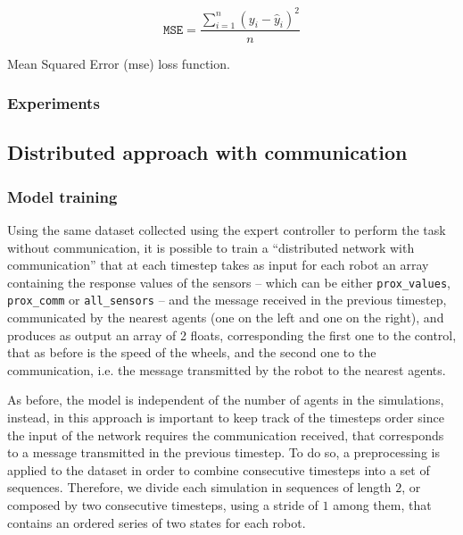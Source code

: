 \begin{Equation}[H]
	\centering
	\begin{equation}
	\mathtt{MSE} = \frac{\sum_{i=1}^n (y_i-\hat y_i)^2}{n}
	\end{equation}
	\caption{Mean Squared Error (\gls{mse}) loss function.}
	\label{eq:mse}
\end{Equation}
	

\subsubsection{Experiments}
\label{subsubsec:expdist}

\subsection{Distributed approach with communication}
\label{subsec:ex1comm}


\subsubsection{Model training}
\label{subsubsec:learnedcomm}

Using the same dataset collected using the expert controller to perform the task 
without communication, it is possible to train a ``distributed network with 
communication'' that at each timestep takes as input for each robot an array 
containing the response values of the sensors – which can be either 
\texttt{prox\_values}, \texttt{prox\_comm} or \texttt{all\_sensors} – and the 
message received in the previous timestep, communicated by the nearest agents 
(one on the left and one on the right), and produces as output an array of 2 
floats, corresponding the first one to the control, that as before is the speed of the 
wheels, and the second one to the communication, i.e. the message transmitted 
by the robot to the nearest agents.

As before, the model is independent of the number of agents in the simulations, 
instead, in this approach is important to keep track of the timesteps order since 
the input of the network requires the communication received, that corresponds 
to a message transmitted in the previous timestep. 
To do so, a preprocessing is applied to the dataset in order to combine 
consecutive timesteps into a set of sequences. Therefore, we divide each 
simulation in sequences of length $2$, or composed by two consecutive 
timesteps, using a stride of $1$ among them, that contains an ordered series of 
two states for each robot.   

